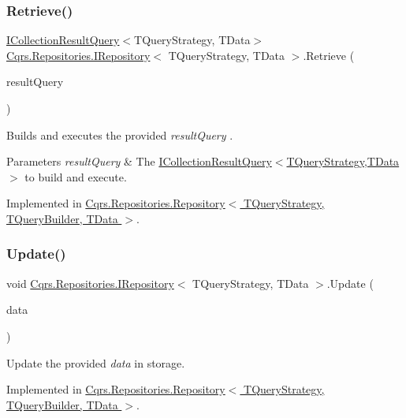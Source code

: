 \subsubsection{\texorpdfstring{Retrieve()}{Retrieve()}\hspace{0.1cm}{\footnotesize\ttfamily [2/2]}}
{\footnotesize\ttfamily \hyperlink{interfaceCqrs_1_1Repositories_1_1Queries_1_1ICollectionResultQuery}{I\+Collection\+Result\+Query}$<$T\+Query\+Strategy, T\+Data$>$ \hyperlink{interfaceCqrs_1_1Repositories_1_1IRepository}{Cqrs.\+Repositories.\+I\+Repository}$<$ T\+Query\+Strategy, T\+Data $>$.Retrieve (\begin{DoxyParamCaption}\item[{\hyperlink{interfaceCqrs_1_1Repositories_1_1Queries_1_1ICollectionResultQuery}{I\+Collection\+Result\+Query}$<$ T\+Query\+Strategy, T\+Data $>$}]{result\+Query }\end{DoxyParamCaption})}



Builds and executes the provided {\itshape result\+Query} . 


\begin{DoxyParams}{Parameters}
{\em result\+Query} & The \hyperlink{interfaceCqrs_1_1Repositories_1_1Queries_1_1ICollectionResultQuery}{I\+Collection\+Result\+Query$<$\+T\+Query\+Strategy,\+T\+Data$>$} to build and execute.\\
\hline
\end{DoxyParams}


Implemented in \hyperlink{classCqrs_1_1Repositories_1_1Repository_ab1136a454f981848d49e0d0a2f4b6a2f_ab1136a454f981848d49e0d0a2f4b6a2f}{Cqrs.\+Repositories.\+Repository$<$ T\+Query\+Strategy, T\+Query\+Builder, T\+Data $>$}.

\mbox{\label{interfaceCqrs_1_1Repositories_1_1IRepository_af8a0b1cf5eedd7653d2867ab38657d46_af8a0b1cf5eedd7653d2867ab38657d46}} 
\subsubsection{\texorpdfstring{Update()}{Update()}}
{\footnotesize\ttfamily void \hyperlink{interfaceCqrs_1_1Repositories_1_1IRepository}{Cqrs.\+Repositories.\+I\+Repository}$<$ T\+Query\+Strategy, T\+Data $>$.Update (\begin{DoxyParamCaption}\item[{T\+Data}]{data }\end{DoxyParamCaption})}



Update the provided {\itshape data}  in storage. 



Implemented in \hyperlink{classCqrs_1_1Repositories_1_1Repository_a893276506e64034992d2c29d5ef11100_a893276506e64034992d2c29d5ef11100}{Cqrs.\+Repositories.\+Repository$<$ T\+Query\+Strategy, T\+Query\+Builder, T\+Data $>$}.

